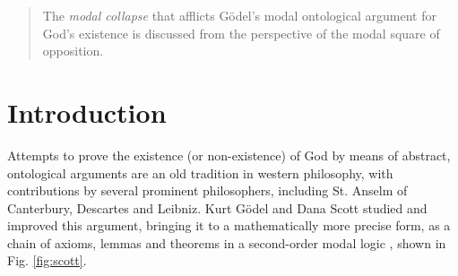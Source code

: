 \documentclass{birkmult}
\theoremstyle{definition}
\theoremstyle{remark}
\numberwithin{equation}{section}
\begin{document}
\begin{abstract}
The \emph{modal collapse} that afflicts G\"odel's modal ontological 
argument for God's existence is discussed from the perspective of the 
modal square of opposition.
\end{abstract}


\maketitle


\section{Introduction}

Attempts to prove the
existence (or non-existence) of God by means of abstract, ontological
arguments are an old tradition in western philosophy, with contributions by several prominent philosophers, including St. Anselm of
Canterbury, Descartes and Leibniz. Kurt G{\"o}del and Dana Scott studied and improved this argument, bringing it to a mathematically more precise form, as a chain of axioms, lemmas and theorems in a second-order modal logic \cite{GoedelNotes,ScottNotes}, shown in Fig. \ref{fig:scott}.
\end{document}
